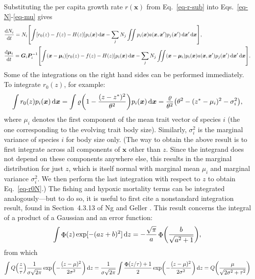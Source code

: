 \documentclass[9pt,twoside,lineno]{pnas-new}
\DeclareMathOperator\erf{\Phi}
\newcommand{\ud}{\text{d}}
\let\originalleft\left
\let\originalright\right
\renewcommand{\left}{\mathopen{}\mathclose\bgroup\originalleft}
\renewcommand{\right}{\aftergroup\egroup\originalright}
\newcommand{\mat}[1]{\bm{#1}}
\begin{document}
Substituting the per capita growth rate $r(\mat{x})$ from Eq.~\ref{eq-r-sub} into Eqs.~\ref{eq-N}-\ref{eq-mu} gives
\begin{align}
  \label{eq-n-LV}
  &\frac{\ud N_i}{\ud t}
  = N_i \left[ \int \left[ r_0(z) - f(z) - H(z) \right]
  p_i(\mat{x}) \,\ud \mat{x}
  - \sum_j N_j \iint p_i(\mat{x}) a(\mat{x},\mat{x}')
  p_j(\mat{x}') \,\ud \mat{x}' \,\ud \mat{x} \right] , \\
  \label{eq-mu-LV}
  &\frac{\ud \mat{\mu}_i}{\ud t}
  = \mat{G}_i\mat{P}_i^{-1} \left[ \int (\mat{x} - \mat{\mu}_i)
  \left[ r_0(z) - f(z) - H(z) \right] p_i(\mat{x}) \,\ud \mat{x}
  - \sum_j N_j \iint (\mat{x} - \mat{\mu}_i)
  p_i(\mat{x}) a(\mat{x},\mat{x}')
  p_j(\mat{x}')\,\ud\mat{x}'\,\ud\mat{x} \right] .
\end{align}
Some of the integrations on the right hand sides can be performed immediately. To integrate $r_0(z)$, for example:
\begin{equation}
  \label{eq-r0N}
  \int r_0(z) p_i(\mat{x}) \,\ud\mat{x}
  = \int \varrho \left( 1 - \frac{(z-z^*)^2}{\theta^{2}} \right)
  p_i(\mat{x}) \,\ud\mat{x}
  = \frac{\varrho}{\theta^2}
  \left(\theta^2 - (z^* - \mu_i)^2 - \sigma_i^2 \right) ,
\end{equation}
where $\mu_i$ denotes the first component of the mean trait vector of species $i$ (the one corresponding to the evolving trait body size). Similarly, $\sigma_i^2$ is the marginal variance of species $i$ for body size only. (The way to obtain the above result is to first integrate across all components of $\mat{x}$ other than $z$. Since the integrand does not depend on these components anywhere else, this results in the marginal distribution for just $z$, which is itself normal with marginal mean $\mu_i$ and marginal variance $\sigma_i^2$. We then perform the last integration with respect to $z$ to obtain Eq.~\ref{eq-r0N}.) The fishing and hypoxic mortality terms can be integrated analogously---but to do so, it is useful to first cite a nonstandard integration result, found in Section~4.3.13 of Ng and Geller \cite{NgGeller1968}. This result concerns the integral of a product of a Gaussian and an error function:
\begin{equation}
  \label{eq-NgGeller}
  \int \erf(z) \exp[-(az+b)^2] \,\ud z
  = -\frac{\sqrt{\pi}}{a}
  \erf \left( \frac{b}{\sqrt{a^2 + 1}} \right) ,
\end{equation}
from which
\begin{equation}
  \label{eq-ErfGauss}
  \int Q\left(\frac{z}{\tau}\right)
  \frac{1}{\sigma \sqrt{2\pi}}
  \exp\left( -\frac{(z-\mu)^2}{2\sigma^2}\right) \,\ud z
  = \frac{1}{\sigma \sqrt{2\pi}}
  \int \frac{\erf(z/\tau) + 1}{2}
  \exp\left( -\frac {(z-\mu)^2}{2\sigma^2} \right) \,\ud z
  = Q\left(\frac{\mu}{\sqrt{2\sigma^2+\tau^2}}\right)
\end{equation}
\end{document}
